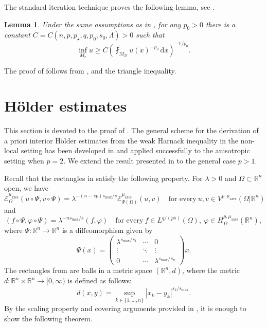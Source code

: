 \documentclass[11pt]{amsart}
\theoremstyle{plain}
\newtheorem{lemma}[theorem]{Lemma}
\theoremstyle{definition}
\numberwithin{equation}{section}
\newcommand{\R}{\mathbb{R}}
\newcommand{\ma}{\mu_{\mathrm{axes}}}
\begin{document}
The standard iteration technique proves the following lemma, see \cite{CK20,DK20}.

\begin{lemma} \label{lem:inf}
Under the same assumptions as in , for any $p_0 > 0$ there is a constant $C = C(n, p, p_{\star}, q, p_0, s_0, \Lambda) > 0$ such that
\begin{equation}\label{eq:infest}
\inf_{M_r} u \geq C \left( \fint_{M_{2r}} u(x)^{-p_0} \, \mathrm{d}x \right)^{-1/p_0}.
\end{equation}
\end{lemma}

The proof of  follows from ,  and the triangle inequality.

\section{H\"older estimates}\label{sec:hoeld}

This section is devoted to the proof of . The general scheme for the derivation of a priori interior H\"older estimates from the weak Harnack inequality in the non-local setting has been developed in \cite{DK20} and applied successfully to the anisotropic setting \cite{CK20} when $p=2$. We extend the result presented in \cite{CK20} to the general case $p > 1$.

Recall that the rectangles in  satisfy the following property. For $\lambda > 0$ and $\Omega \subset \R^n$ open, we have
\begin{equation*}
\mathcal{E}_\Omega^{\ma}(u\circ \Psi, v \circ \Psi) = \lambda^{-(n-\bar{s}p)s_{\max}/\bar{s}} \mathcal{E}_{\Psi(\Omega)}^{\ma}(u, v) \quad\text{for every}~ u, v \in V^{p,\ma}(\Omega|\R^n)
\end{equation*}
and
\begin{equation*}
(f \circ \Psi, \varphi \circ \Psi) = \lambda^{-ns_{\max}/\bar{s}} (f, \varphi)  \quad\text{for every}~ f \in L^{q/(p\bar{s})}(\Omega),~ \varphi \in H^{p,\ma}_{\Omega}(\R^n),
\end{equation*}
where $\Psi : \R^n \to \R^n$ is a diffeomorphism given by
\begin{equation} \label{eq:Psi}
\Psi(x) =
\begin{pmatrix}
\lambda^{s_{\max}/s_1} & \cdots & 0 \\
\vdots & \ddots & \vdots \\
0 & \cdots & \lambda^{s_{\max}/s_n}
\end{pmatrix}x.
\end{equation}
The rectangles from  are balls in a metric space $(\R^n,d)$, where the metric $d:\R^n\times\R^n\to[0,\infty)$ is defined as follows:
 \[ d(x,y) = \sup_{k\in\{1,\dots,n\}} |x_k-y_k|^{s_k/s_{\max}}. \]
By the scaling property and covering arguments provided in \cite{CK20}, it is enough to show the following theorem. 
\end{document}
